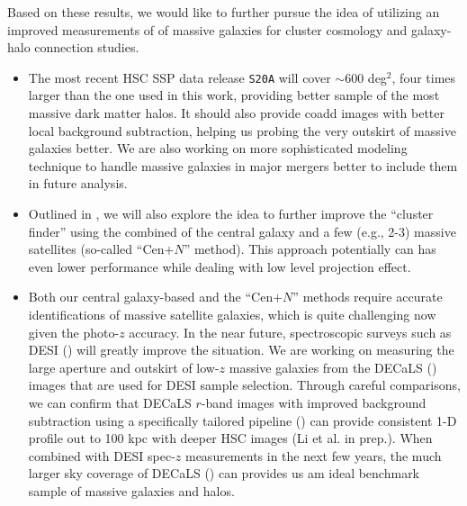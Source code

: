 \documentclass[fleqn,usenatbib,useAMS,english]{mnras}
\begin{document}
    Based on these results, we would like to further pursue the idea of utilizing an improved
    measurements of \mstar{} of massive galaxies for cluster cosmology and galaxy-halo connection
    studies.


    \begin{itemize}

        \item The most recent HSC SSP data release \texttt{S20A} will cover $\sim 600$ deg$^2$,
            four times larger than the one used in this work, providing better sample of the
            most massive dark matter halos.
            It should also provide coadd images with better local background subtraction, helping
            us probing the very outskirt of massive galaxies better.
            We are also working on more sophisticated modeling technique to handle massive
            galaxies in major mergers better to include them in future analysis.

        \item Outlined in \citet{Bradshaw2020}, we will also explore the idea to further improve
            the ``cluster finder'' using the combined \mstar{} of the central galaxy and a few
            (e.g., 2-3) massive satellites (so-called ``Cen$+N$'' method).
            This approach potentially can has even lower \sigmh{} performance while dealing with
            low level projection effect.

        \item Both our central galaxy-based and the ``Cen$+N$'' methods require accurate identifications
            of massive satellite galaxies, which is quite challenging now given the photo-$z$
            accuracy.
            In the near future, spectroscopic surveys such as DESI (\addref{}) will greatly improve
            the situation.
            We are working on measuring the large aperture and outskirt \mstar{} of low-$z$ massive
            galaxies from the DECaLS (\addref{}) images that are used for DESI sample selection.
            Through careful comparisons, we can confirm that DECaLS $r$-band images with improved
            background subtraction using a specifically tailored pipeline (\addref{}) can provide
            consistent 1-D profile out to 100 kpc with deeper HSC images (Li et al. in prep.).
            When combined with DESI spec-$z$ measurements in the next few years, the much larger
            sky coverage of DECaLS () can provides us am ideal benchmark sample
            of massive galaxies and halos.

    \end{itemize}
\end{document}

